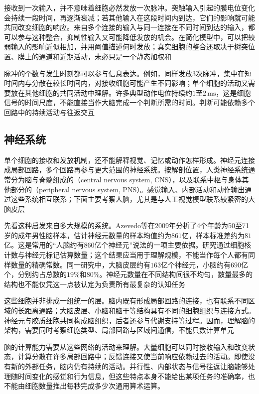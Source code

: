 接收到一次输入，并不意味着细胞必然发放一次脉冲。突触输入引起的膜电位变化会持续一段时间，再逐渐衰减；若其他输入在这段时间内到达，它们的影响就可能共同改变细胞的响应。来自多个连接的输入与同一连接在不同时间到达的输入，都可以参与这种整合，抑制性输入又可能降低发放的机会。在简化模型中，可以把较弱输入的影响近似相加，并用阈值描述何时发放；真实细胞的整合还取决于树突位置、膜上的通道和近期活动，未必只是一个静态加权和

脉冲的个数与发生时刻都可以参与信息表达。例如，同样发放3次脉冲，集中在短时间内与分散在较长时间内，对接收细胞可能产生不同影响；单个细胞的活动又需要放在其他细胞的共同活动中理解。许多典型动作电位持续约$1$至$2\,\mathrm{ms}$，这是细胞信号的时间尺度，不能直接当作大脑完成一个判断所需的时间。判断可能依赖多个回路中的持续活动与往返交互

\FloatBarrier
\subsection{神经系统}
\label{sec:neural-biological-system}

单个细胞的接收和发放机制，还不能解释视觉、记忆或动作怎样形成。神经元连接成局部回路，多个回路再参与更大范围的神经系统。按解剖位置，人类神经系统通常分为脑与脊髓组成的（central nervous system, CNS），以及联系中枢与身体其他部分的（peripheral nervous system, PNS）。感觉输入、内部活动和动作输出通过这些系统相互联系；下面主要考察人脑，尤其是与人工视觉模型联系较紧密的大脑皮层

先看这种启发来自多大规模的系统。Azevedo等在2009年分析了4个年龄为50至71岁的成年男性脑样本，估计神经元数量的样本均值约为$861$亿，样本标准差约为$81$亿。这是常用的“人脑约有860亿个神经元”说法的一项主要依据。研究通过细胞核计数与神经元标记估算数量；这个结果应当用于理解规模，不能当作每个人都有同样数量的精确常数。同一研究中，大脑皮层约有$163$亿个神经元，小脑约有$690$亿个，分别约占总数的$19\%$和$80\%$。神经元数量在不同结构间很不均匀，数量最多的结构也不能仅凭这一点被认定为负责所有最复杂的认知任务

这些细胞并非排成一组统一的层。脑内既有形成局部回路的连接，也有联系不同区域的长距离通路；大脑皮层、小脑和脑干等结构具有不同的细胞组织与连接方式。神经元与胶质细胞共同构成脑组织，后者还参与代谢支持等过程。因而，理解脑的架构，需要同时考察细胞类型、局部回路与区域间通信，不能只数计算单元

脑的计算能力需要从这些网络的活动来理解。大量细胞可以同时接收输入和改变状态，计算分散在许多局部回路中；反馈连接又使当前响应依赖过去的活动。即使没有新的外部任务，脑内仍有持续的活动。并行性、内部状态与信号往返让脑能够处理随时间变化的感觉和行为信息，但这些特点本身不能给出某项任务的准确率，也不能由细胞数量推出每秒完成多少次通用算术运算。

